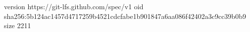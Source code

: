 version https://git-lfs.github.com/spec/v1
oid sha256:5b124ac1457d4717259b4521cdcfabe1b901847a6aa086f42402a3c9cc39b0b9
size 2211
